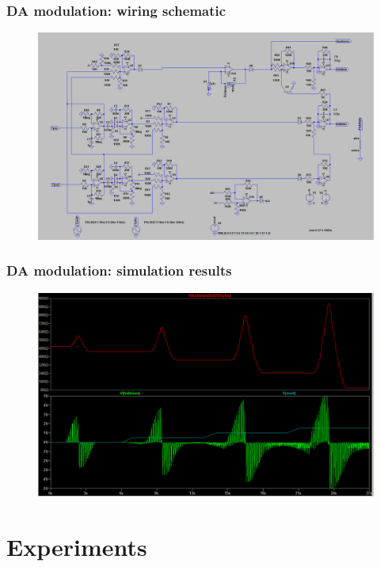 \documentclass[12pt, aspectratio=169]{beamer}
\begin{document}
\begin{frame}
\frametitle{DA modulation: wiring schematic}
\begin{figure}
\includegraphics[width=0.85\linewidth]{da_modulation_sch}
\end{figure}
\end{frame}



\begin{frame}
\frametitle{DA modulation: simulation results}
\begin{figure}
\includegraphics[width=0.8\linewidth]{da_modulation}
\end{figure}
\end{frame}

\section{Experiments}
\end{document}
